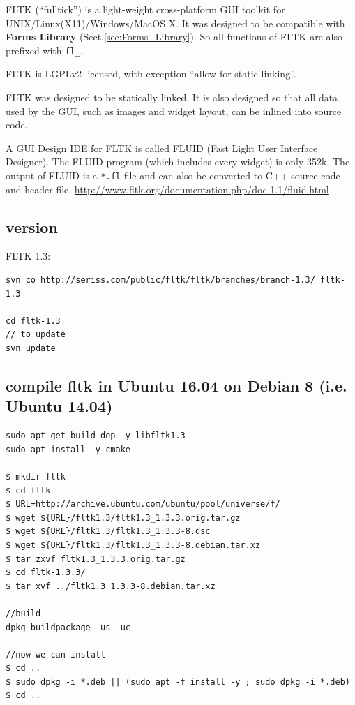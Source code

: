 FLTK (``fulltick'') is a light-weight cross-platform GUI toolkit for
UNIX/Linux(X11)/Windows/MacOS X. It was designed to be compatible with
{\bf Forms Library} (Sect.\ref{sec:Forms_Library}). So all functions of FLTK are
also prefixed with \verb!fl_!. 

FLTK is LGPLv2 licensed, with exception ``allow for static linking''. 

FLTK was designed to be statically linked. It is also designed so that all data
used by the GUI, such as images and widget layout, can be inlined into source code.


A GUI Design IDE for FLTK is called FLUID (Fast Light User Interface Designer).
The FLUID program (which includes every widget) is only 352k. 
The output of FLUID is a \verb!*.fl! file and can also be converted to C++
source code and header file.
\url{http://www.fltk.org/documentation.php/doc-1.1/fluid.html}

\subsection{version}

FLTK 1.3:
\begin{verbatim}
svn co http://seriss.com/public/fltk/fltk/branches/branch-1.3/ fltk-1.3

cd fltk-1.3 
// to update
svn update
\end{verbatim}


\subsection{compile fltk in Ubuntu 16.04 on Debian 8 (i.e. Ubuntu 14.04)}
\label{sec:fltk-1.3+-Ubuntu-14.04}

\begin{verbatim}
sudo apt-get build-dep -y libfltk1.3
sudo apt install -y cmake

$ mkdir fltk
$ cd fltk
$ URL=http://archive.ubuntu.com/ubuntu/pool/universe/f/
$ wget ${URL}/fltk1.3/fltk1.3_1.3.3.orig.tar.gz
$ wget ${URL}/fltk1.3/fltk1.3_1.3.3-8.dsc
$ wget ${URL}/fltk1.3/fltk1.3_1.3.3-8.debian.tar.xz
$ tar zxvf fltk1.3_1.3.3.orig.tar.gz
$ cd fltk-1.3.3/
$ tar xvf ../fltk1.3_1.3.3-8.debian.tar.xz

//build
dpkg-buildpackage -us -uc

//now we can install
$ cd ..
$ sudo dpkg -i *.deb || (sudo apt -f install -y ; sudo dpkg -i *.deb)
$ cd ..
\end{verbatim}



